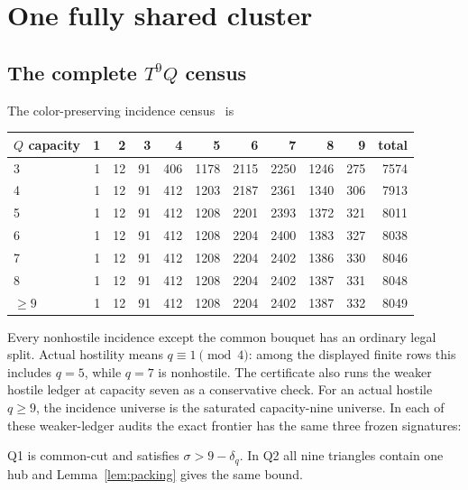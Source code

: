 \documentclass[11pt]{article}
\newcommand{\sig}{\sigma}
\begin{document}
\section{One fully shared cluster}

\subsection{The complete \texorpdfstring{$T^9Q$}{T9Q} census}

The color-preserving incidence census~\cite{T9QFull} is
\begin{center}
\small
\begin{tabular}{lrrrrrrrrr|r}
\toprule
$Q$ capacity&1&2&3&4&5&6&7&8&9&total\\
\midrule
3&1&12&91&406&1178&2115&2250&1246&275&7574\\
4&1&12&91&412&1203&2187&2361&1340&306&7913\\
5&1&12&91&412&1208&2201&2393&1372&321&8011\\
6&1&12&91&412&1208&2204&2400&1383&327&8038\\
7&1&12&91&412&1208&2204&2402&1386&330&8046\\
8&1&12&91&412&1208&2204&2402&1387&331&8048\\
$\geq9$&1&12&91&412&1208&2204&2402&1387&332&8049\\
\bottomrule
\end{tabular}
\end{center}
Every nonhostile incidence except the common bouquet has an ordinary legal
split.  Actual hostility means $q\equiv1\pmod4$: among the displayed finite
rows this includes $q=5$, while $q=7$ is nonhostile.  The certificate also runs
the weaker hostile ledger at capacity seven as a conservative check.  For an
actual hostile $q\geq9$, the incidence universe is the saturated capacity-nine
universe.  In each of these weaker-ledger audits the exact frontier has the
same three frozen signatures:
\begin{description}
\small
\item[Q1] 
\item[Q2] 
\item[Q3] 
\end{description}
Q1 is common-cut and satisfies $\sig>9-\delta_q$.  In Q2 all nine triangles
contain one hub and Lemma~\ref{lem:packing} gives the same bound.
\end{document}
